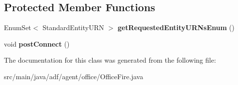 \subsection*{Protected Member Functions}
\begin{DoxyCompactItemize}
\item 
\hypertarget{classadf_1_1agent_1_1office_1_1OfficeFire_a1ad22c57d0f7649c111b65217b779193}{}\label{classadf_1_1agent_1_1office_1_1OfficeFire_a1ad22c57d0f7649c111b65217b779193} 
Enum\+Set$<$ Standard\+Entity\+U\+RN $>$ {\bfseries get\+Requested\+Entity\+U\+R\+Ns\+Enum} ()
\item 
\hypertarget{classadf_1_1agent_1_1office_1_1OfficeFire_ada55a932ac893b51205a4339df032102}{}\label{classadf_1_1agent_1_1office_1_1OfficeFire_ada55a932ac893b51205a4339df032102} 
void {\bfseries post\+Connect} ()
\end{DoxyCompactItemize}


The documentation for this class was generated from the following file\+:\begin{DoxyCompactItemize}
\item 
src/main/java/adf/agent/office/Office\+Fire.\+java\end{DoxyCompactItemize}
